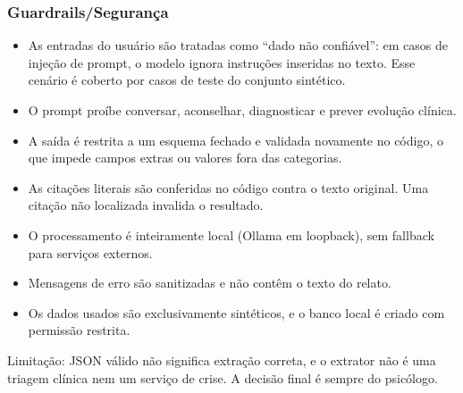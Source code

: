 \documentclass[12pt,a4paper]{article}
\begin{document}
\subsubsection{Guardrails/Segurança}
\begin{itemize}
  \item As entradas do usuário são tratadas como ``dado não confiável'': em casos de injeção
        de prompt, o modelo ignora instruções inseridas no texto. Esse cenário é coberto por
        casos de teste do conjunto sintético.
  \item O prompt proíbe conversar, aconselhar, diagnosticar e prever evolução clínica.
  \item A saída é restrita a um esquema fechado e validada novamente no código, o que impede
        campos extras ou valores fora das categorias.
  \item As citações literais são conferidas no código contra o texto original. Uma citação não
        localizada invalida o resultado.
  \item O processamento é inteiramente local (Ollama em loopback), sem fallback para serviços
        externos.
  \item Mensagens de erro são sanitizadas e não contêm o texto do relato.
  \item Os dados usados são exclusivamente sintéticos, e o banco local é criado com
        permissão restrita.
\end{itemize}
Limitação: JSON válido não significa extração correta, e o extrator não é uma triagem clínica
nem um serviço de crise. A decisão final é sempre do psicólogo.
\end{document}
